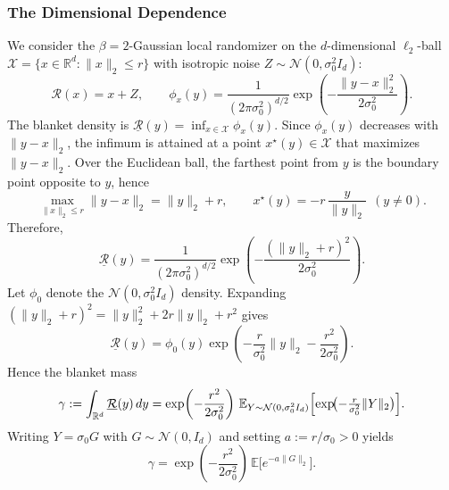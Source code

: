 \documentclass{article}
\theoremstyle{plain}
\theoremstyle{definition}
\begin{document}
\subsubsection{The Dimensional Dependence}
\label{app:dim-dependence-gamma}
We consider the $\beta=2$-Gaussian local randomizer on the $d$-dimensional
$\ell_2$-ball $\mathcal X=\{x\in\mathbb R^d:\|x\|_2\le r\}$ with isotropic noise
$Z\sim\mathcal N(0,\sigma_0^2 I_d)$:
\[
\mathcal R(x)=x+Z,\qquad 
\phi_x(y)=\frac{1}{(2\pi\sigma_0^2)^{d/2}}
\exp\!\left(-\frac{\|y-x\|_2^2}{2\sigma_0^2}\right).
\]
The blanket density is $\underline{\mathcal R}(y)=\inf_{x\in\mathcal X}\phi_x(y)$.
Since $\phi_x(y)$ decreases with $\|y-x\|_2$, the infimum is attained at a point
$x^\star(y)\in\mathcal X$ that maximizes $\|y-x\|_2$. Over the Euclidean ball,
the farthest point from $y$ is the boundary point opposite to $y$, hence
\[
\max_{\|x\|_2\le r}\|y-x\|_2=\|y\|_2+r,
\qquad
x^\star(y)=-r\,\frac{y}{\|y\|_2}\ \ (y\neq 0).
\]
Therefore,
\[
\underline{\mathcal R}(y)
=\frac{1}{(2\pi\sigma_0^2)^{d/2}}
\exp\!\left(-\frac{(\|y\|_2+r)^2}{2\sigma_0^2}\right).
\]
Let $\phi_0$ denote the $\mathcal N(0,\sigma_0^2 I_d)$ density. Expanding
$(\|y\|_2+r)^2=\|y\|_2^2+2r\|y\|_2+r^2$ gives
\[
\underline{\mathcal R}(y)
=\phi_0(y)\exp\!\left(-\frac{r}{\sigma_0^2}\|y\|_2-\frac{r^2}{2\sigma_0^2}\right).
\]
Hence the blanket mass
\[
\gamma:=\int_{\mathbb R^d}\underline{\mathcal R}(y)\,dy
=\exp\!\left(-\frac{r^2}{2\sigma_0^2}\right)\,
\mathbb E_{Y\sim\mathcal N(0,\sigma_0^2 I_d)}
\Bigl[\exp\!\bigl(-\tfrac{r}{\sigma_0^2}\|Y\|_2\bigr)\Bigr].
\]
Writing $Y=\sigma_0 G$ with $G\sim\mathcal N(0,I_d)$ and setting
$a:=r/\sigma_0>0$ yields
\begin{equation}
\label{eq:gamma-laplace-norm}
\gamma
=\exp\!\left(-\frac{r^2}{2\sigma_0^2}\right)\,
\mathbb E\bigl[e^{-a\|G\|_2}\bigr].
\end{equation}
\end{document}
